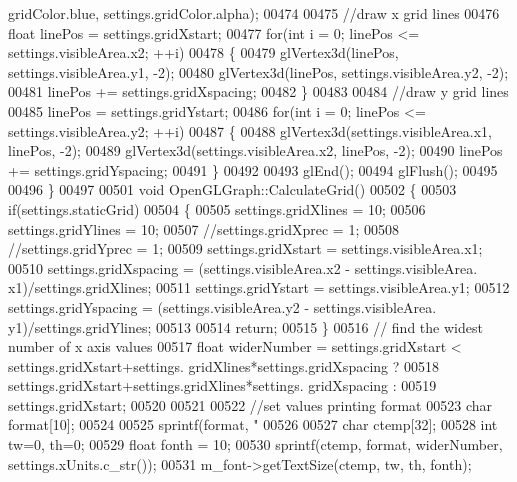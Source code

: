 \begin{DoxyCode}
{{{{{{{      gridColor.blue, settings.gridColor.alpha);
00474 
00475     \textcolor{comment}{//draw x grid lines}
00476     \textcolor{keywordtype}{float} linePos = settings.gridXstart;
00477     \textcolor{keywordflow}{for}(\textcolor{keywordtype}{int} i = 0; linePos <= settings.visibleArea.x2; ++i)
00478     \{
00479         glVertex3d(linePos, settings.visibleArea.y1, -2);
00480         glVertex3d(linePos, settings.visibleArea.y2, -2);
00481         linePos += settings.gridXspacing;
00482     \}
00483 
00484     \textcolor{comment}{//draw y grid lines}
00485     linePos = settings.gridYstart;
00486     \textcolor{keywordflow}{for}(\textcolor{keywordtype}{int} i = 0; linePos <= settings.visibleArea.y2; ++i)
00487     \{
00488         glVertex3d(settings.visibleArea.x1, linePos, -2);
00489         glVertex3d(settings.visibleArea.x2, linePos, -2);
00490         linePos += settings.gridYspacing;
00491     \}
00492 
00493     glEnd();
00494     glFlush();
00495 
00496 \}
00497 
00501 \textcolor{keywordtype}{void} OpenGLGraph::CalculateGrid()
00502 \{
00503     \textcolor{keywordflow}{if}(settings.staticGrid)
00504     \{
00505         settings.gridXlines = 10;
00506         settings.gridYlines = 10;
00507         \textcolor{comment}{//settings.gridXprec = 1;}
00508         \textcolor{comment}{//settings.gridYprec = 1;}
00509         settings.gridXstart = settings.visibleArea.x1;
00510         settings.gridXspacing = (settings.visibleArea.x2 - settings.visibleArea.
      x1)/settings.gridXlines;
00511         settings.gridYstart = settings.visibleArea.y1;
00512         settings.gridYspacing = (settings.visibleArea.y2 - settings.visibleArea.
      y1)/settings.gridYlines;
00513 
00514         \textcolor{keywordflow}{return};
00515     \}
00516     \textcolor{comment}{// find the widest number of x axis values}
00517     \textcolor{keywordtype}{float} widerNumber = settings.gridXstart < settings.gridXstart+settings.
      gridXlines*settings.gridXspacing ?
00518                          settings.gridXstart+settings.gridXlines*settings.
      gridXspacing :
00519                          settings.gridXstart;
00520 
00521 
00522     \textcolor{comment}{//set values printing format}
00523     \textcolor{keywordtype}{char} format[10];
00524 
00525     sprintf(format, \textcolor{stringliteral}{"%
00526 
00527     \textcolor{keywordtype}{char} ctemp[32];
00528     \textcolor{keywordtype}{int} tw=0, th=0;
00529     \textcolor{keywordtype}{float} fonth = 10;
00530     sprintf(ctemp, format, widerNumber, settings.xUnits.c\_str());
00531     m_font->getTextSize(ctemp, tw, th, fonth);
}}}}}}}}
\end{DoxyCode}
